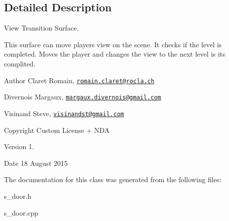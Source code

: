 \subsection{Detailed Description}
View Transition Surface. 

This surface can move player\textquotesingle{}s view on the scene. It checks if the level is completed. Moves the player and changes the view to the next level is it\textquotesingle{}s complited. \begin{DoxyAuthor}{Author}
Claret Romain, \href{mailto:romain.claret@rocla.ch}{\tt romain.\+claret@rocla.\+ch} 

Divernois Margaux, \href{mailto:margaux.divernois@gmail.com}{\tt margaux.\+divernois@gmail.\+com} 

Visinand Steve, \href{mailto:visinandst@gmail.com}{\tt visinandst@gmail.\+com} 
\end{DoxyAuthor}
\begin{DoxyCopyright}{Copyright}
Custom License + N\+D\+A 
\end{DoxyCopyright}
\begin{DoxyVersion}{Version}
1. 
\end{DoxyVersion}
\begin{DoxyDate}{Date}
18 August 2015 
\end{DoxyDate}


The documentation for this class was generated from the following files\+:\begin{DoxyCompactItemize}
\item 
s\+\_\+door.\+h\item 
s\+\_\+door.\+cpp\end{DoxyCompactItemize}
